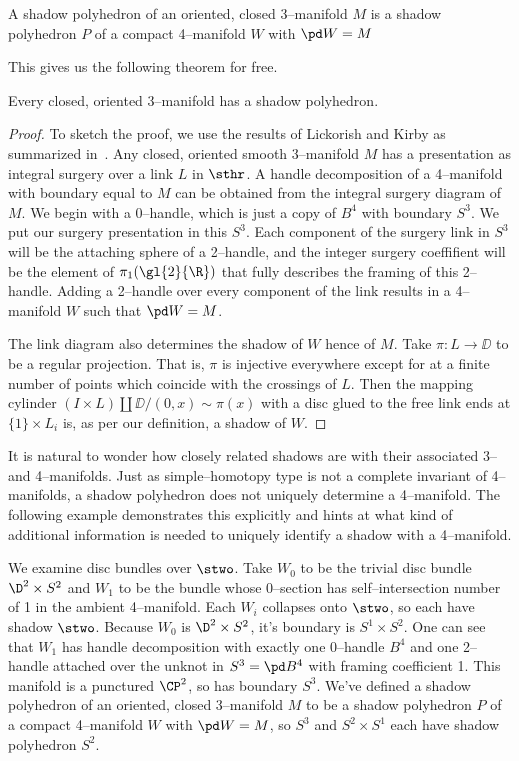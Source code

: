 \begin{defn}
  A shadow polyhedron of an oriented, closed 3--manifold $M$ is a shadow polyhedron $P$ of a compact 4--manifold $W$ with $\pd W=M$
\end{defn}

This gives us the following theorem for free.

\begin{theorem}
  \label{the:shadowexistence}
  Every closed, oriented 3--manifold has a shadow polyhedron.
\end{theorem}

\begin{proof}
  To sketch the proof, we use the results of Lickorish and Kirby as summarized in~\cite{GompStip}.
  Any closed, oriented smooth 3--manifold $M$ has a presentation as integral surgery over a link $L$ in $\sthr$.
  A handle decomposition of a 4--manifold with boundary equal to $M$ can be obtained from the integral surgery diagram of $M$.
  We begin with a 0--handle, which is just a copy of $B^4$ with boundary $S^3$.
  We put our surgery presentation in this $S^3$.
  Each component of the surgery link in $S^3$ will be the attaching sphere of a 2--handle, and the integer surgery coeffifient will be the element of $\pi_1(\gl{2}{\R})$ that fully describes the framing of this 2--handle.
  Adding a 2--handle over every component of the link results in a 4--manifold $W$ such that $\pd W=M$.
 
  The link diagram also determines the shadow of $W$ hence of $M$.
  Take $\pi:L\to \DD$ to be a regular projection.
  That is, $\pi$ is injective everywhere except for at a finite number of points which coincide with the crossings of $L$.
  Then the mapping cylinder $(I\times L)\coprod \DD/(0,x)\sim\pi(x)$ with a disc glued to the free link ends at $\{1\}\times L_i$ is, as per our definition, a shadow of $W$.
\end{proof}

It is natural to wonder how closely related shadows are with their associated 3-- and 4--manifolds.
Just as simple--homotopy type is not a complete invariant of 4--manifolds, a shadow polyhedron does not uniquely determine a 4--manifold.
The following example demonstrates this explicitly and hints at what kind of additional information is needed to uniquely identify a shadow with a 4--manifold.

\begin{ex}
  \label{ex:polypoly}
  We examine disc bundles over $\stwo$.
  Take $W_0$ to be the trivial disc bundle $\D^2\times S^2$ and $W_1$ to be the bundle whose 0--section has self--intersection number of 1 in the ambient 4--manifold.
  Each $W_i$ collapses onto $\stwo$, so each have shadow $\stwo$.
  Because $W_0$ is $\D^2\times S^2$, it's boundary is $S^1\times S^2$.
  One can see that $W_1$ has handle decomposition with exactly one 0--handle $B^4$ and one 2--handle attached over the unknot in $S^3=\pd B^4$ with framing coefficient 1.
  This manifold is a punctured $\CP^2$, so has boundary $S^3$.
  We've defined a shadow polyhedron of an oriented, closed 3--manifold $M$ to be a shadow polyhedron $P$ of a compact 4--manifold $W$ with $\pd W=M$, so $S^3$ and $S^2\times S^1$ each have shadow polyhedron $S^2$.
\end{ex}

